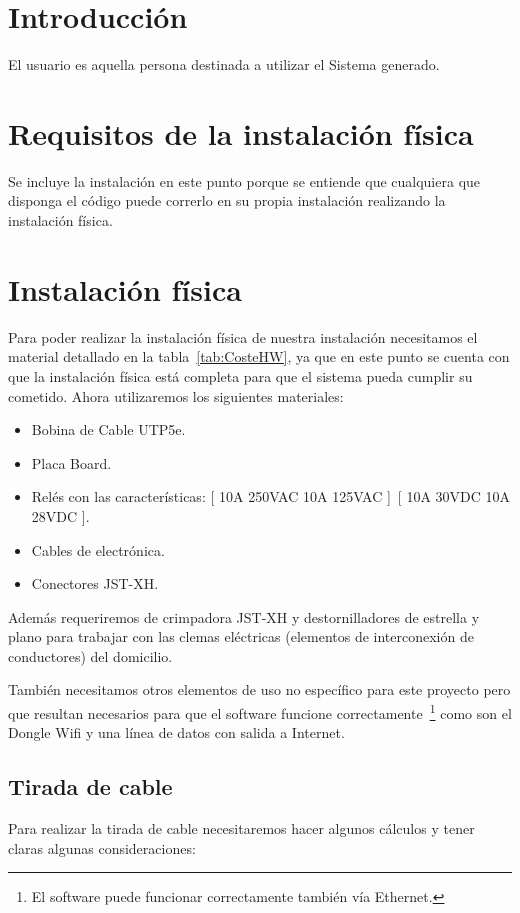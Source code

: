 
\section{Introducción}
El usuario es aquella persona destinada a utilizar el Sistema generado.

\section{Requisitos de la instalación física}
Se incluye la instalación en este punto porque se entiende que cualquiera que disponga el código puede correrlo en su propia instalación realizando la instalación física.

\section{Instalación física}
Para poder realizar la instalación física de nuestra instalación necesitamos el material detallado en la tabla~\ref{tab:CosteHW}, ya que en este punto se cuenta con que la instalación física está completa para que el sistema pueda cumplir su cometido. Ahora utilizaremos los siguientes materiales:
\begin{itemize}
    \item Bobina de Cable UTP5e.
    \item Placa Board.
    \item Relés con las características: [ 10A 250VAC 10A 125VAC ]~[ 10A 30VDC 10A 28VDC ].
    \item Cables de electrónica.
    \item Conectores JST-XH.
\end{itemize}

Además requeriremos de crimpadora JST-XH y destornilladores de estrella y plano para trabajar con las clemas eléctricas (elementos de interconexión de conductores) del domicilio.

También necesitamos otros elementos de uso no específico para este proyecto pero que resultan necesarios para que el software funcione correctamente~\footnote{El software puede funcionar correctamente también vía Ethernet.} como son el Dongle Wifi y una línea de datos con salida a Internet.

\subsection{Tirada de cable}
Para realizar la tirada de cable necesitaremos hacer algunos cálculos y tener claras algunas consideraciones:

